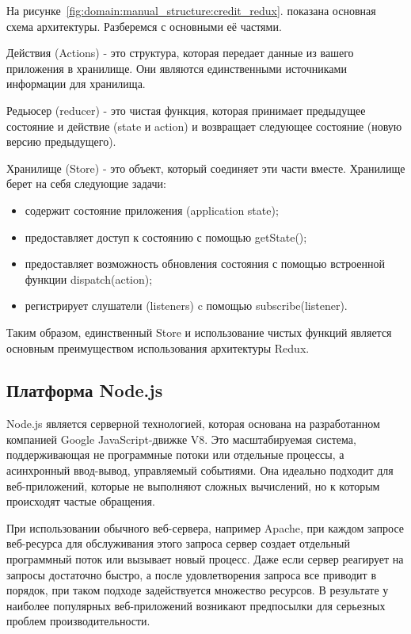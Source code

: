 На рисунке~\ref{fig:domain:manual_structure:credit_redux}. показана основная схема архитектуры. Разберемся с основными её частями.

Действия (Actions) - это структура, которая передает данные из вашего приложения в хранилище. Они являются единственными источниками информации для хранилища.

Редьюсер (reducer) - это чистая функция, которая принимает предыдущее состояние и действие (state и action) и возвращает следующее состояние (новую версию предыдущего).

Хранилище (Store) - это объект, который соединяет эти части вместе. Хранилище берет на себя следующие задачи:
\begin{itemize}
  \item содержит состояние приложения (application state);
  \item предоставляет доступ к состоянию с помощью getState();
  \item предоставляет возможность обновления состояния с помощью встроенной функции dispatch(action);
  \item регистрирует слушатели (listeners) c помощью subscribe(listener).
\end{itemize}

Таким образом, единственный Store и использование чистых функций является основным преимуществом использования архитектуры Redux.


\subsection{Платформа Node.js}
\label{sub:domain:mdl_principle}
Node.js является серверной технологией, которая основана на разработанном компанией Google JavaScript-движке V8. Это масштабируемая система, поддерживающая не программные потоки или отдельные процессы, а асинхронный ввод-вывод, управляемый событиями. Она идеально подходит для веб-приложений, которые не выполняют сложных вычислений, но к которым происходят частые обращения.

При использовании обычного веб-сервера, например Apache, при каждом запросе веб-ресурса для обслуживания этого запроса сервер создает отдельный программный поток или вызывает новый процесс. Даже если сервер реагирует на запросы достаточно быстро, а после удовлетворения запроса все приводит в порядок, при таком подходе задействуется множество ресурсов. В результате у наиболее популярных веб-приложений возникают предпосылки для серьезных проблем производительности.

